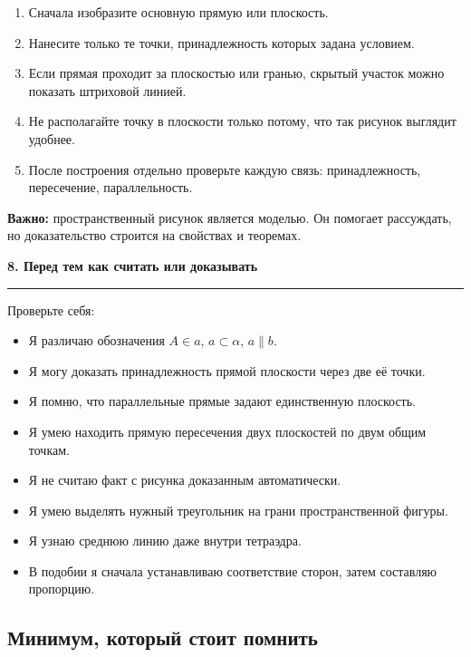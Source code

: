 \documentclass[a4paper,12pt]{article}
\newcommand{\lessonsection}[1]{%
  \vspace{0.4em}
  {\Large\bfseries\color{darkaccent}#1}\par
  \vspace{0.25em}
  {\color{lightaccent}\rule{\linewidth}{0.8pt}}
  \vspace{0.6em}
}
\newcommand{\key}[1]{\textbf{\color{darkaccent}#1}}
\begin{document}
\begin{enumerate}[leftmargin=9mm,itemsep=2mm]
  \item Сначала изобразите основную прямую или плоскость.
  \item Нанесите только те точки, принадлежность которых задана условием.
  \item Если прямая проходит за плоскостью или гранью, скрытый участок
        можно показать штриховой линией.
  \item Не располагайте точку в плоскости только потому, что так рисунок
        выглядит удобнее.
  \item После построения отдельно проверьте каждую связь:
        принадлежность, пересечение, параллельность.
\end{enumerate}

\key{Важно:}
пространственный рисунок является моделью. Он помогает рассуждать, но
доказательство строится на свойствах и теоремах.


\lessonsection{8. Перед тем как считать или доказывать}

Проверьте себя:

\begin{itemize}[leftmargin=8mm,itemsep=2.5mm]
  \item[$\square$] Я различаю обозначения
  \(A\in a\), \(a\subset\alpha\), \(a\parallel b\).
  \item[$\square$] Я могу доказать принадлежность прямой плоскости
  через две её точки.
  \item[$\square$] Я помню, что параллельные прямые задают единственную
  плоскость.
  \item[$\square$] Я умею находить прямую пересечения двух плоскостей
  по двум общим точкам.
  \item[$\square$] Я не считаю факт с рисунка доказанным автоматически.
  \item[$\square$] Я умею выделять нужный треугольник на грани
  пространственной фигуры.
  \item[$\square$] Я узнаю среднюю линию даже внутри тетраэдра.
  \item[$\square$] В подобии я сначала устанавливаю соответствие сторон,
  затем составляю пропорцию.
\end{itemize}

\subsection*{\color{darkaccent}Минимум, который стоит помнить}
\end{document}
